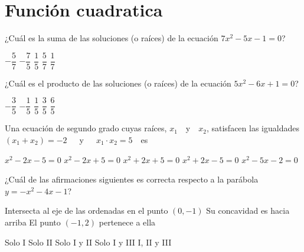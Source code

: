 \documentclass[sin nombre]{srs2}
\begin{document}
\section{Función cuadratica}

\begin{preguntas}
\pregunta ¿Cuál es la suma de las soluciones (o raíces) de la ecuación $7x^2 - 5x - 1 = 0$?
\begin{alternativas}
\alternativa $-\dfrac{5}{7}$
\alternativa $-\dfrac{7}{5}$
\alternativa $\dfrac{1}{5}$
\alternativa $\dfrac{5}{7}$
\alternativa $\dfrac{1}{7}$
\end{alternativas}

\pregunta ¿Cuál es el producto de las soluciones (o raíces) de la ecuación $5x^2 - 6x + 1 = 0$?
\begin{alternativas}
\alternativa $-\dfrac{3}{5}$
\alternativa $-\dfrac{1}{5}$
\alternativa $\dfrac{1}{5}$
\alternativa $\dfrac{3}{5}$
\alternativa $\dfrac{6}{5}$
\end{alternativas}

\pregunta Una ecuación de segundo grado cuyas raíces, $x_1$~~y~~$x_2$, satisfacen las igualdades $\left(x_1 + x_2\right) = -2$~~~y~~~$x_1 \cdot x_2 = 5$~~es
\begin{alternativas}
\alternativa $x^2 - 2x - 5 = 0$
\alternativa $x^2 - 2x + 5 = 0$
\alternativa $x^2 + 2x + 5 = 0$
\alternativa $x^2 + 2x - 5 = 0$
\alternativa $x^2 - 5x - 2 = 0$
\end{alternativas}

\pregunta ¿Cuál de las afirmaciones siguientes es correcta respecto a la parábola $y = -x^2 - 4x - 1$?
\begin{opciones}
\opcion Intersecta al eje de las ordenadas en el punto $\left(0, -1\right)$
\opcion Su concavidad es hacia arriba
\opcion El punto $\left(-1, 2\right)$ pertenece a ella
\end{opciones}
\begin{alternativas}
\alternativa Solo I
\alternativa Solo II
\alternativa Solo I y II
\alternativa Solo I y III
\alternativa I, II y III
\end{alternativas}


\end{preguntas}
\end{document}
